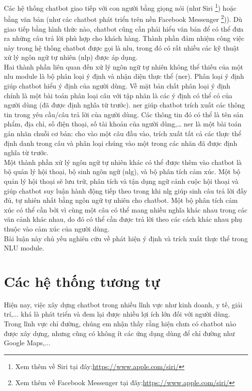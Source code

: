 Các hệ thống chatbot giao tiếp với con người bằng giọng nói (như Siri \footnote{Xem thêm về Siri tại đây:\url{https://www.apple.com/siri/}}) hoặc bằng văn bản (như các chatbot phát triển trên nền Facebook Messenger \footnote{Xem thêm về Facebook Messenger tại đây:\url{https://www.apple.com/siri/}})). Dù giao tiếp bằng hình thức nào, chatbot cũng cần phải hiểu văn bản để có thể đưa ra những câu trả lời phù hợp cho khách hàng. Thành phần đảm nhiệm công việc này trong hệ thống chatbot được gọi là \ac{nlu}, trong đó có rất nhiều các kỹ thuật xử lý ngôn ngữ tự nhiên (\ac{nlp}) được áp dụng.
\\
Hai thành phần liên quan đến xử lý ngôn ngữ tự nhiên không thể thiếu của một \ac{nlu} module là bộ phân loại ý định và nhận diện thực thể (\ac{ner}). Phân loại ý định giúp chatbot hiểu ý định của người dùng. Về mặt bản chất phân loại ý định chính là một bài toán phân loại câu với tập nhãn là các ý định có thể có của người dùng (đã được định nghĩa từ trước). \ac{ner} giúp chatbot trích xuất các thông tin trong yêu cầu/câu trả lời của người dùng. Các thông tin đó có thể là tên sản phẩm, địa chỉ, số điện thoại, số tài khoản của người dùng,… \ac{ner} là một bài toán gán nhãn chuỗi cơ bản: cho vào một câu đầu vào, trích xuất tất cả các thực thể định danh trong câu và phân loại chúng vào một trong các nhãn đã được định nghĩa từ trước.
\\
Một thành phần xử lý ngôn ngữ tự nhiên khác có thể được thêm vào chatbot là bộ quản lý hội thoại, bộ sinh ngôn ngữ (\ac{nlg}), và bộ phân tích cảm xúc. Một bộ quản lý hội thoại sẽ lưu trữ, phân tích và tận dụng ngữ cảnh cuộc hội thoại và giúp chatbot suy luận hành động tiếp theo trong khi \ac{nlg} giúp sinh câu trả lời đầy đủ, tự nhiên nhất bằng ngôn ngữ tự nhiên cho chatbot. Một bộ phân tích cảm xúc có thể cần bởi vì cùng một câu có thể mang nhiều nghĩa khác nhau trong các văn cảnh khác nhau, do đó có thể cần được trả lời theo các cách khác nhau phụ thuộc vào cảm xúc của người dùng.
\\
Bài luận này chủ yếu nghiên cứu về phát hiện ý định và trích xuất thực thể trong NLU module.

\section{Các hệ thống tương tự}

Hiện nay, việc xây dựng chatbot trong nhiều lĩnh vực như kinh doanh, y tế, giải trí,... khá là phát triển và đem lại được nhiều lợi ích lớn đối với người dùng. Trong lĩnh vực chỉ đường, chúng em nhận thấy rằng hiện chưa có chatbot nào được xây dựng, nhưng cũng có không ít các ứng dụng dùng để chỉ đường như Google Maps\cite{ggmaps},...

